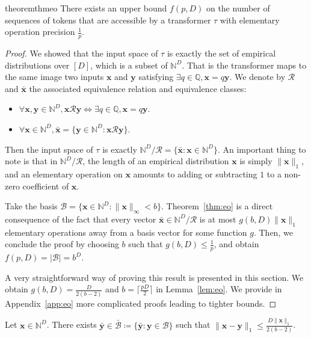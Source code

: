 \begin{restatable}{theorem}{thmeo}\label{thm:eo}
    There exists an upper bound $f(p,D)$ on the number of sequences of tokens that are accessible by a transformer $\tau$ with elementary operation precision $\frac1p$.
\end{restatable}


\begin{proof}
    We showed that the input space of $\tau$ is exactly the set of empirical distributions over $[D]$, which is a subset of $\mathbb N^D$. That is the transformer maps to the same image two inputs $\mathbf x$ and $\mathbf y$ satisfying $\exists q\in\mathbb Q,\mathbf x=q\mathbf y$. We denote by $\mathcal R$ and $\bar{\mathbf x}$ the associated equivalence relation and equivalence classes:
    \begin{itemize}
        \item $\forall \mathbf x,\mathbf y\in\mathbb N^D,\mathbf x\mathcal R \mathbf y\iff\exists q\in\mathbb Q,\mathbf x=q\mathbf y$.
        \item $\forall\mathbf x\in\mathbb N^D,\bar{\mathbf x}=\{\mathbf y\in\mathbb N^D\colon \mathbf x\mathcal R\mathbf y\}$.
    \end{itemize}
    Then the input space of $\tau$ is exactly $\mathbb N^D/\mathcal R=\{\bar{\mathbf x}\colon\mathbf x\in\mathbb N^D\}$. An important thing to note is that in $\mathbb N^D/\mathcal R$, the length of an empirical distribution $\mathbf x$ is simply $\|\mathbf x\|_1$, and an elementary operation on $\mathbf x$ amounts to adding or subtracting $1$ to a non-zero coefficient of $\mathbf x$.
    
    Take the basis $\mathcal B=\{\mathbf x\in\mathbb N^D\colon\|\mathbf x\|_\infty<b\}$. Theorem~\ref{thm:eo} is a direct consequence of the fact that every vector $\bar{\mathbf x}\in\mathbb N^D/\mathcal R$ is at most $g(b,D)\|\mathbf x\|_1$ elementary operations away from a basis vector for some function $g$. Then, we conclude the proof by choosing $b$ such that $g(b,D)\le\frac1p$, and obtain $f(p,D)=|\mathcal B|=b^D$.
    
    A very straightforward way of proving this result is presented in this section. We obtain $g(b,D)=\frac{D}{2(b-2)}$ and $b=\big\lceil\frac {pD}2\big\rceil$ in Lemma~\ref{lem:eo}. We provide in Appendix~\ref{app:eo} more complicated proofs leading to tighter bounds.
\end{proof}

\begin{lemma}\label{lem:eo}
    Let $\mathbf x\in\mathbb N^D$. There exists $\bar{\mathbf y}\in\bar{\mathcal B}\coloneqq\{\bar{\mathbf y}\colon\mathbf y\in\mathcal B\}$ such that $\|\mathbf x-\mathbf y\|_1\leq \frac{D\|\mathbf x\|_1}{2(b-2)}$.
\end{lemma}

